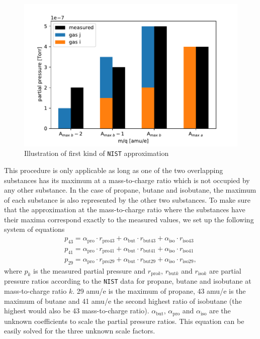 \begin{figure}[h!]
    \centering
    \includegraphics[width=\textwidth]{Report/DataResultsPlots/ilustration_nist_approx1.pdf}
    \caption{Illustration of first kind of \texttt{NIST} approximation}
    \label{fig:illustration_nist1}
\end{figure}

This procedure is only applicable as long as one of the two overlapping substances has its maximum at a mass-to-charge ratio which is not occupied by any other substance.  In the case of propane, butane and isobutane, the maximum of each substance is also represented by the other two substances. To make sure that the approximation at the mass-to-charge ratio where the substances have their maxima correspond exactly to the measured values, we set up the following system of equations  
\begin{align} \label{eq:coef1}
    p_{43} = \alpha_{\mathrm{pro}}\cdot r_\mathrm{pro43} + \alpha_\mathrm{but} \cdot r_\mathrm{but43} + \alpha_\mathrm{iso}\cdot r_\mathrm{iso43} \\
    \label{eq:coef2}
    p_{41} = \alpha_{\mathrm{pro}}\cdot r_\mathrm{pro41} + \alpha_\mathrm{but} \cdot r_\mathrm{but41} + \alpha_\mathrm{iso}\cdot r_\mathrm{iso41} \\
    \label{eq:coef3}
    p_{29} = \alpha_{\mathrm{pro}}\cdot r_\mathrm{pro29} + \alpha_\mathrm{but} \cdot r_\mathrm{but29} + \alpha_\mathrm{iso}\cdot r_\mathrm{iso29},
\end{align}
where $p_k$ is the measured partial pressure and $r_{\mathrm{pro}k}$, $r_{\mathrm{but}k}$ and $r_{\mathrm{iso}k}$ are partial pressure ratios according to the \texttt{NIST} data for propane, butane and isobutane at mass-to-charge ratio $k$. 29 amu/e is the maximum of propane, 43 amu/e is the maximum of butane and 41 amu/e the second highest ratio of isobutane (the highest would also be 43 mass-to-charge ratio). $\alpha_\mathrm{but}$, $\alpha_\mathrm{pro}$ and $\alpha_\mathrm{iso}$ are the unknown coefficients to scale the partial pressure ratios. This equation can be easily solved for the three unknown scale factors. 

